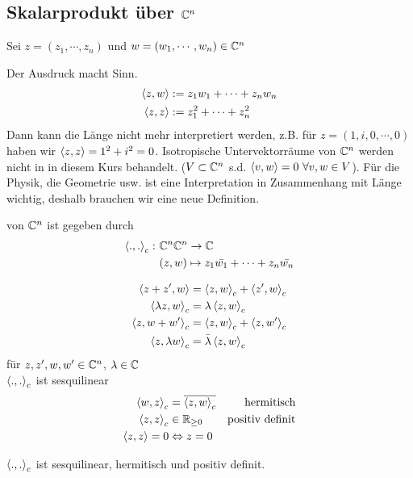 \subsection{Skalarprodukt über $\mathbb{C}^n$}
Sei $z=(z_1,\cdots,z_n)$ und $w=(w_1,\cdots,w_n)\in\mathbb{C}^n$
\begin{Bem}
  Der Ausdruck macht Sinn.
  \begin{align*}
    \left\langle z,w \right\rangle&:=z_1w_1+\cdots+z_nw_n\\
    \left\langle z,z \right\rangle&:=z_1^2+\cdots+z_n^2\\
  \end{align*}
  Dann kann die Länge nicht mehr interpretiert werden, z.B. für $z=(1,i,0,\cdots,0)$ haben wir $\left\langle z,z \right\rangle=1^2+i^2=0$. Isotropische Untervektorräume von $\mathbb{C}^n$ werden nicht in in diesem Kurs behandelt. ($V\subset\mathbb{C}^n$ s.d. $\left\langle v,w \right\rangle=0 \ \forall v,w\in V$). Für die Physik, die Geometrie usw. ist eine Interpretation in Zusammenhang mit Länge wichtig, deshalb brauchen wir eine neue Definition.
\end{Bem}
\begin{Def}
  von $\mathbb{C}^n$ ist gegeben durch
  \begin{align*}
    \left\langle .,. \right\rangle_c:&\ \mathbb{C}^n\mathbb{C}^n\to\mathbb{C}\\
    &\ (z,w)\mapsto z_1\bar{w_1}+\cdots+z_n\bar{w_n}
  \end{align*}
\end{Def}
\begin{Eig}
  \begin{align*}
    \left\langle z+z',w \right\rangle&= \left\langle z,w \right\rangle_c+\left\langle z',w \right\rangle_c\\
    \left\langle \lambda z,w \right\rangle_c&= \lambda\left\langle z,w \right\rangle_c\\
    \left\langle z,w+w' \right\rangle_c&= \left\langle z,w \right\rangle_c+\left\langle z,w' \right\rangle_c\\
    \left\langle z,\lambda w \right\rangle_c&= \bar{\lambda}\left\langle z,w \right\rangle_c
  \end{align*}
  für $z,z',w,w'\in\mathbb{C}^n$, $\lambda\in\mathbb{C}$\\
  $\left\langle .,. \right\rangle_c$ ist sesquilinear
  \begin{align*}
    \left\langle w,z \right\rangle_c&= \overline{\left\langle z,w \right\rangle_c}& \text{hermitisch}\\
    \left\langle z,z \right\rangle_c&\in\mathbb{R}_{\geq 0}& \text{positiv definit}\\
    \left\langle z,z \right\rangle=0 &\Leftrightarrow z=0
  \end{align*}
\end{Eig}
\begin{Faz}
  $\left\langle .,. \right\rangle_c$ ist sesquilinear, hermitisch und positiv definit.
\end{Faz}
